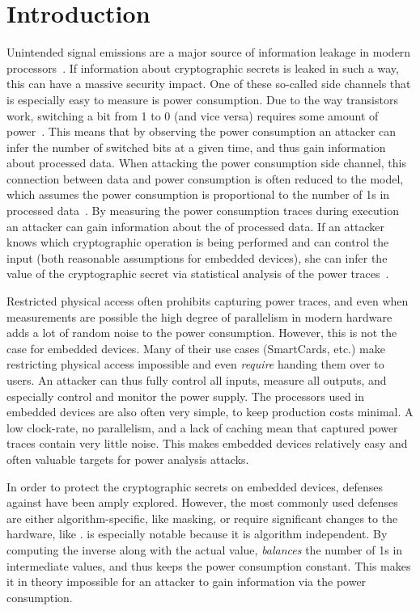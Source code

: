 \chapter{Introduction}
Unintended signal emissions are a major source of information leakage in modern processors~\cite{coron2000statistics}.
If information about cryptographic secrets is leaked in such a way, this can have a massive security impact.
One of these so-called side channels that is especially easy to measure is power consumption.
Due to the way transistors work, switching a bit from 1 to 0 (and vice versa) requires some amount of power~\cite{kocher1998introduction}.
This means that by observing the power consumption an attacker can infer the number of switched bits at a given time, and thus gain information about processed data.
When attacking the power consumption side channel, this connection between data and power consumption is often reduced to the \hammingw{} model, which assumes the power consumption is proportional to the number of 1s in processed data~\cite{brier2004correlation}.
By measuring the power consumption traces during execution an attacker can gain information about the \hammingw{} of processed data.
If an attacker knows which cryptographic operation is being performed and can control the input (both reasonable assumptions for embedded devices), she can infer the value of the cryptographic secret via statistical analysis of the power traces~\cite{brier2004correlation}.

Restricted physical access often prohibits capturing power traces, and even when measurements are possible the high degree of parallelism in modern hardware adds a lot of random noise to the power consumption.
However, this is not the case for embedded devices.
Many of their use cases (SmartCards, etc.) make restricting physical access impossible and even \emph{require} handing them over to users.
An attacker can thus fully control all inputs, measure all outputs, and especially control and monitor the power supply.
The processors used in embedded devices are also often very simple, to keep production costs minimal.
A low clock-rate, no parallelism, and a lack of caching mean that captured power traces contain very little noise.
This makes embedded devices relatively easy and often valuable targets for power analysis attacks.

In order to protect the cryptographic secrets on embedded devices, defenses against \poweranalysis{} have been amply explored.
However, the most commonly used defenses are either algorithm-specific, like masking, or require significant changes to the hardware, like \dual{}\cite{sokolov2005design}.
\Dual{} is especially notable because it is algorithm independent.
By computing the inverse along with the actual value, \dual{} \emph{balances} the number of 1s in intermediate values, and thus keeps the power consumption constant.
This makes it in theory impossible for an attacker to gain information via the power consumption.

